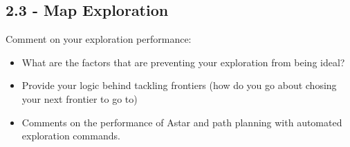 \documentclass[journal,onecolumn]{IEEEtran}
\begin{document}
\subsection*{2.3 - Map Exploration} 

Comment on your exploration performance:
 \begin{itemize}
    \item What are the factors that are preventing your exploration from being ideal?
    \item Provide your logic behind tackling frontiers (how do you go about chosing your next frontier to go to)
    \item Comments on the performance of Astar and path planning with automated exploration commands.
\end{itemize}

\ifCLASSOPTIONcaptionsoff
  \newpage
\fi

\nocite{*}


\end{document}
